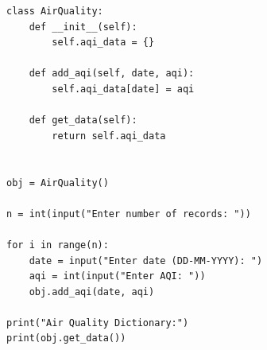 \begin{verbatim}
class AirQuality:
    def __init__(self):
        self.aqi_data = {}

    def add_aqi(self, date, aqi):
        self.aqi_data[date] = aqi

    def get_data(self):
        return self.aqi_data


obj = AirQuality()

n = int(input("Enter number of records: "))

for i in range(n):
    date = input("Enter date (DD-MM-YYYY): ")
    aqi = int(input("Enter AQI: "))
    obj.add_aqi(date, aqi)

print("Air Quality Dictionary:")
print(obj.get_data())
\end{verbatim}